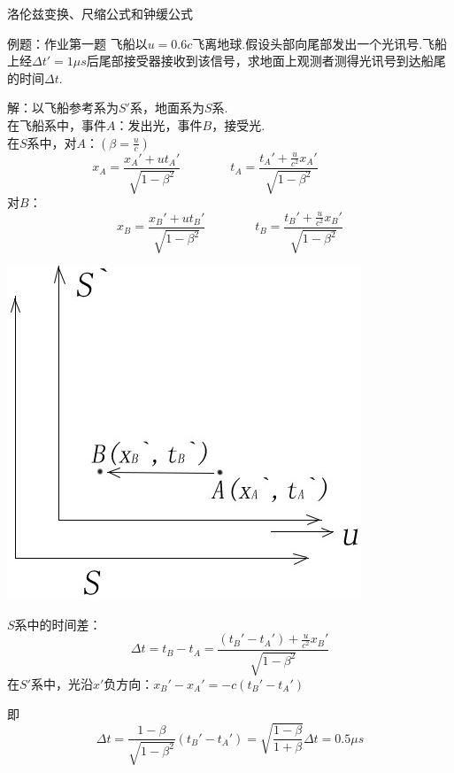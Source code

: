\documentclass[a4paper,titlepage,onecolmn]{ctexart}
\begin{document}
\begin{section}{洛伦兹变换、尺缩公式和钟缓公式}
\begin{subsection}{例题：作业第一题}
飞船以$u=0.6c$飞离地球.假设头部向尾部发出一个光讯号.飞船上经$\Delta t'=1\mu s$后尾部接受器接收到该信号，求地面上观测者测得光讯号到达船尾的时间$\Delta t$.
\begin{multicols}{2}
解：以飞船参考系为$S'$系，地面系为$S$系.\\
在飞船系中，事件$A$：发出光，事件$B$，接受光.\\
在$S$系中，对$A$：$(\beta=\frac{u}{c})$
\begin{equation*}
x_A=\frac{x_A'+ut_A'}{\sqrt{1-\beta^2}} \hspace{4em} 
t_A=\frac{t_A'+\frac{u}{c^2}x_A'}{\sqrt{1-\beta^2}} \hspace{4em}
\end{equation*}
对$B$：
\begin{equation*}
x_B=\frac{x_B'+ut_B'}{\sqrt{1-\beta^2}} \hspace{4em}
t_B=\frac{t_B'+\frac{u}{c^2}x_B'}{\sqrt{1-\beta^2}}
\end{equation*}

\hspace{4em}
\includegraphics[scale=0.5]{Chp5_addin_illus (1).jpg}
\end{multicols}

$S$系中的时间差：
\begin{equation*}
\Delta t = t_B - t_A = \frac{(t_B'-t_A')+\frac{u}{c^2}x_B'}{\sqrt{1-\beta^2}}
\end{equation*}
在$S'$系中，光沿$x'$负方向：$x_B'-x_A'=-c(t_B'-t_A')$

即
\begin{equation*}
\Delta t=\frac{1-\beta}{\sqrt{1-\beta^2}}(t_B'-t_A')=\sqrt{\frac{1-\beta}{1+\beta}}\Delta t
=0.5\mu s
\end{equation*}


\end{subsection}
\end{section}
\end{document}
